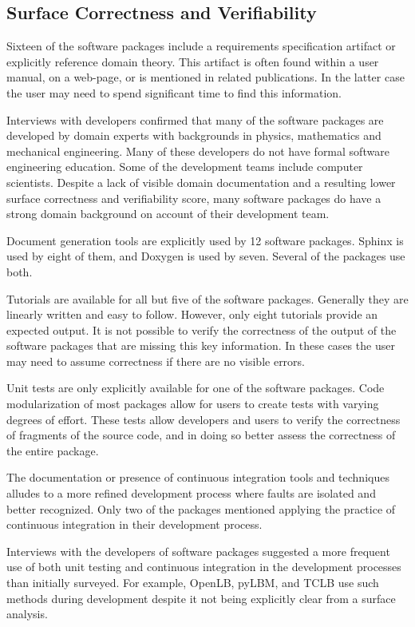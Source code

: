 \documentclass[12pt, notitlepage]{article}
\begin{document}
\subsection{Surface Correctness and Verifiability}

Sixteen of the software packages include a requirements specification artifact or explicitly reference domain theory. This artifact is often found within a user manual, on a web-page, or is mentioned in related publications. In the latter case the user may need to spend significant time to find this information. 

Interviews with developers confirmed that many of the software packages are developed by domain experts with backgrounds in physics, mathematics and mechanical engineering. Many of these developers do not have formal software engineering education. Some of the development teams include computer scientists. Despite a lack of visible domain documentation and a resulting lower surface correctness and verifiability score, many software packages do have a strong domain background on account of their development team. 

Document generation tools are explicitly used by 12 software packages. Sphinx is used by eight of them, and Doxygen is used by seven. Several of the packages use both.

Tutorials are available for all but five of the software packages. Generally they are linearly written and easy to follow. However, only eight tutorials provide an expected output. It is not possible to verify the correctness of the output of the software packages that are missing this key information. In these cases the user may need to assume correctness if there are no visible errors. 

Unit tests are only explicitly available for one of the software packages. Code modularization of most packages allow for users to create tests with varying degrees of effort. These tests allow developers and users to verify the correctness of fragments of the source code, and in doing so better assess the correctness of the entire package.

The documentation or presence of continuous integration tools and techniques alludes to a more refined development process where faults are isolated and better recognized. Only two of the packages mentioned applying the practice of continuous integration in their development process. 

Interviews with the developers of software packages suggested a more frequent use of both unit testing and continuous integration in the development processes than initially surveyed. For example, OpenLB, pyLBM, and TCLB use such methods during development despite it not being explicitly clear from a surface analysis. 
\end{document}
